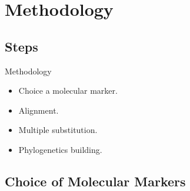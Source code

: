 \documentclass[10pt]{beamer}
\newcommand{\1}{
	\setbeamertemplate{background}{
		\texttt{[image: img/1]}
		\tikz[overlay] \fill[fill opacity=0.75,fill=white] (0,0) rectangle (-\paperwidth,\paperheight);
	}
}
\begin{document}
\section{Methodology}

\subsection{Steps}

\begin{frame}{Methodology}{}
	\begin{block}{}
		\begin{itemize}
			\item Choice a molecular marker.
			\item Alignment.
			\item Multiple substitution.
			\item Phylogenetics building.
		\end{itemize}
	\end{block}
\end{frame}

\subsection{Choice of Molecular Markers}
\end{document}

